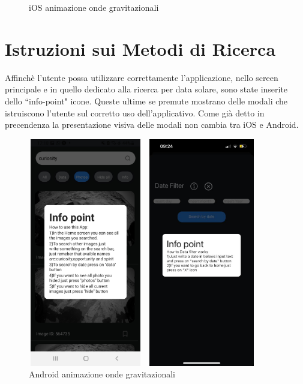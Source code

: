 \begin{figure}[H]
\begin{minipage}[h]{0.47\textwidth}
        \caption{\label{animazioneIphone} iOS animazione onde gravitazionali}
    \end{minipage}
\end{figure}

\section*{Istruzioni sui Metodi di Ricerca}
Affinch\`e l'utente possa utilizzare correttamente l'applicazione, nello screen principale e in quello dedicato alla ricerca per data solare, sono state inserite dello ``info-point" icone.
Queste ultime se premute mostrano delle modali che istruiscono l'utente sul corretto uso dell'applicativo. Come gi\`a detto in precendenza la presentazione visiva delle modali non cambia tra iOS e Android.
\begin{figure}[H]
    \begin{minipage}[h]{0.47\textwidth}
        \centering
        \includegraphics[width=5cm, height=10cm]{images/immaginiAndroid/infoPoint.jpg}
        \caption{\label{infoPointAndroid} Android animazione onde gravitazionali}
    \end{minipage}
    \hfill
    \begin{minipage}[h]{0.47\textwidth}
        \centering
        \includegraphics[width=5cm, height=10cm]{images/immaginiPhone/infoPoint.jpeg}

\end{minipage}
\end{figure}
